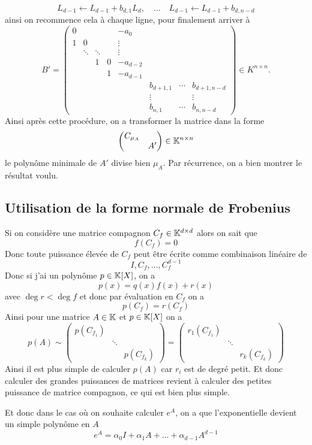 {\[
L_{d-1} \leftarrow L_{d-1} + b_{d,1} L_d, \quad \ldots \quad L_{d-1} \leftarrow L_{d-1} + b_{d, n-d}
\]
ainsi on recommence cela à chaque ligne, pour finalement arriver à 
\[
B' =
\begin{pmatrix}
	0      &        &        &        & -a_0     &    &  &  \\
	1      & 0      &        &        & \vdots   &    &  &  \\
	& \ddots & \ddots &        & \vdots   &     &        &  \\
	&        & 1      & 0      & -a_{d-2} &     &  &  \\
	&        &        & 1      & -a_{d-1} &    &  &  \\
	&  &  &       &         & b_{d+1,1} & \cdots & b_{d+1,n-d} \\
	&        &        &  &    & \vdots    &        & \vdots \\
	&  &  &       &         & b_{n,1}   & \cdots & b_{n,n-d}
\end{pmatrix}
\in K^{n\times n}.
\]
Ainsi après cette procédure, on a transformer la matrice dans la forme
\[
\begin{pmatrix} C_{\mu_A} &  \\  & A' \end{pmatrix} \in \mathbb K^{n \times n}
\]
le polynôme minimale de $A'$ divise bien $\mu_A$. Par récurrence, on a bien montrer le résultat voulu.
}

\subsection{Utilisation de la forme normale de Frobenius}
Si on considère une matrice compagnon $C_f \in \mathbb K^{d \times d}$ alors on sait que
\[
f(C_f) = 0
\]
Donc toute puissance élevée de $C_f$ peut être écrite comme combinaison linéaire de 
\[
I, C_f, \ldots, C_f^{d-1}
\]
Donc si j'ai un polynôme $p \in \mathbb K[X]$, on a
\[
p(x) = q(x) f(x) + r(x)
\]
avec $\deg r < \deg f$ et donc par évaluation en $C_f$ on a
\[
p(C_f) = r(C_f)
\]
Ainsi pour une matrice $A \in \mathbb K$ et $p \in \mathbb K[X]$ on a
\[
p(A) \sim \begin{pmatrix} p(C_{f_1}) &  & \\
							& \ddots & \\
							&  & p(C_{f_k})
		\end{pmatrix}
		= 
		\begin{pmatrix} r_1(C_{f_1}) &  & \\
			& \ddots & \\
			&  & r_k(C_{f_k})
		\end{pmatrix}
\]
Ainsi il est plus simple de calculer $p(A)$ car $r_i$ est de degré petit. Et donc calculer des grandes puissances de matrices revient à calculer des petites puissance de matrice compagnon, ce qui est bien plus simple.

Et donc dans le cas où on souhaite calculer $e^A$, on a que l'exponentielle devient un simple polynôme en $A$
\[
e^A = \alpha_0 I + \alpha_1 A + \ldots + \alpha_{d-1} A^{d-1}
\]
